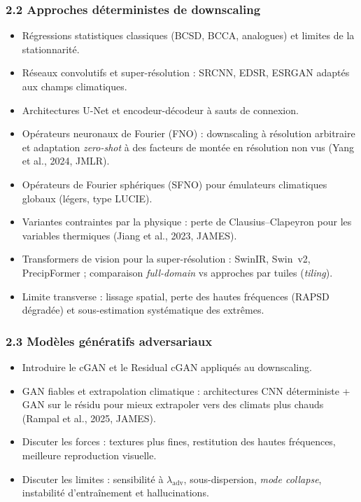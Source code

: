 \documentclass[12pt,a4paper]{article}
\begin{document}
\subsubsection*{2.2 Approches d\'eterministes de downscaling}
\begin{itemize}
    \item R\'egressions statistiques classiques (BCSD, BCCA, analogues) et limites de la stationnarit\'e.
    \item R\'eseaux convolutifs et super-r\'esolution : SRCNN, EDSR, ESRGAN adapt\'es aux champs climatiques.
    \item Architectures U-Net et encodeur-d\'ecodeur \`a sauts de connexion.
    \item Op\'erateurs neuronaux de Fourier (FNO) : downscaling \`a r\'esolution arbitraire et adaptation \emph{zero-shot} \`a des facteurs de mont\'ee en r\'esolution non vus (Yang et al., 2024, JMLR).
    \item Op\'erateurs de Fourier sph\'eriques (SFNO) pour \'emulateurs climatiques globaux (l\'egers, type LUCIE).
    \item Variantes contraintes par la physique : perte de Clausius--Clapeyron pour les variables thermiques (Jiang et al., 2023, JAMES).
    \item Transformers de vision pour la super-r\'esolution : SwinIR, Swin~v2, PrecipFormer ; comparaison \emph{full-domain} vs approches par tuiles (\emph{tiling}).
    \item Limite transverse : lissage spatial, perte des hautes fr\'equences (RAPSD d\'egrad\'ee) et sous-estimation syst\'ematique des extr\^emes.
\end{itemize}

\subsubsection*{2.3 Mod\`eles g\'en\'eratifs adversariaux}
\begin{itemize}
    \item Introduire le cGAN et le Residual cGAN appliqu\'es au downscaling.
    \item GAN fiables et extrapolation climatique : architectures CNN d\'eterministe + GAN sur le r\'esidu pour mieux extrapoler vers des climats plus chauds (Rampal et al., 2025, JAMES).
    \item Discuter les forces : textures plus fines, restitution des hautes fr\'equences, meilleure reproduction visuelle.
    \item Discuter les limites : sensibilit\'e \`a $\lambda_{\mathrm{adv}}$, sous-dispersion, \emph{mode collapse}, instabilit\'e d'entra\^inement et hallucinations.
\end{itemize}
\end{document}
